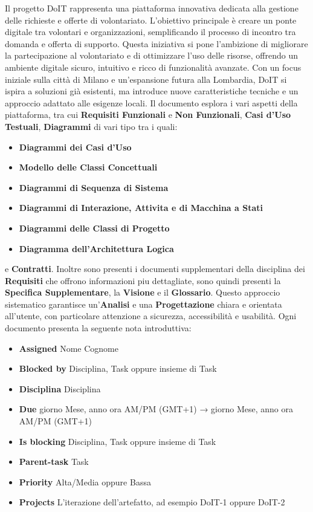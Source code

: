 Il progetto DoIT rappresenta una piattaforma innovativa dedicata alla gestione delle richieste e offerte di volontariato. 
L'obiettivo principale è creare un ponte digitale tra volontari e organizzazioni, semplificando il processo di incontro tra 
domanda e offerta di supporto.
Questa iniziativa si pone l'ambizione di migliorare la partecipazione al volontariato e di ottimizzare l'uso delle risorse, 
offrendo un ambiente digitale sicuro, intuitivo e ricco di funzionalità avanzate. Con un focus iniziale sulla città di Milano e
un’espansione futura alla Lombardia, DoIT si ispira a soluzioni già esistenti, ma introduce nuove caratteristiche tecniche e un 
approccio adattato alle esigenze locali.
Il documento esplora i vari aspetti della piattaforma, tra cui \textbf{Requisiti Funzionali} e \textbf{Non Funzionali}, 
\textbf{Casi d'Uso Testuali}, \textbf{Diagrammi} di vari tipo tra i quali: 
    \begin{itemize}
        \item \textbf{Diagrammi dei Casi d'Uso} 
        \item \textbf{Modello delle Classi Concettuali} 
        \item \textbf{Diagrammi di Sequenza di Sistema} 
        \item \textbf{Diagrammi di Interazione, Attivita e di Macchina a Stati} 
        \item \textbf{Diagrammi delle Classi di Progetto}
        \item \textbf{Diagramma dell'Architettura Logica} 
    \end{itemize}
e \textbf{Contratti}. 
Inoltre sono presenti i documenti supplementari della disciplina dei \textbf{Requisiti} che offrono informazioni piu dettagliate, 
sono quindi presenti la \textbf{Specifica Supplementare}, la \textbf{Visione} e il \textbf{Glossario}. 
Questo approccio sistematico garantisce un'\textbf{Analisi} e una \textbf{Progettazione} chiara e orientata all'utente, con particolare 
attenzione a sicurezza, accessibilità e usabilità.
Ogni documento presenta la seguente nota introduttiva:
\begin{itemize}
    \item \textbf{Assigned} Nome Cognome
    \item \textbf{Blocked by} Disciplina, Task oppure insieme di Task
    \item \textbf{Disciplina} Disciplina
    \item \textbf{Due} giorno Mese, anno ora AM/PM (GMT+1) → giorno Mese, anno ora AM/PM (GMT+1)
    \item \textbf{Is blocking} Disciplina, Task oppure insieme di Task
    \item \textbf{Parent-task} Task
    \item \textbf{Priority} Alta/Media oppure Bassa
    \item \textbf{Projects} L'iterazione dell'artefatto, ad esempio DoIT-1 oppure DoIT-2
\end{itemize}
